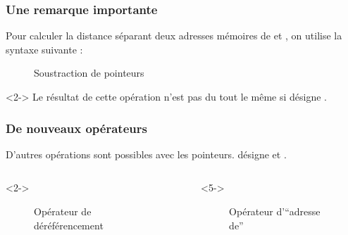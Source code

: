 \documentclass{cppcourses}
\begin{document}
\begin{frame}

\frametitle{Une remarque importante}

Pour calculer la distance séparant deux adresses mémoires de   et , on utilise la syntaxe suivante :

\begin{figure}
\caption{Soustraction de pointeurs}
\end{figure}

\begin{warning}<2->
Le résultat de cette opération n'est pas du tout le même si  désigne .
\end{warning}

\end{frame}

\begin{frame}

\frametitle{De nouveaux opérateurs}

D'autres opérations sont possibles avec les pointeurs.  désigne  et  .

\begin{columns}[c]
    \begin{column}{0.5\textwidth}<2->

\begin{figure}
\caption{Opérateur de déréférencement}
\end{figure}



    \end{column}

    \begin{column}{0.5\textwidth}<5->

\begin{figure}
\caption{Opérateur d'\enquote{adresse de}}
\end{figure}



    \end{column}
\end{columns}

\end{frame}
\end{document}
